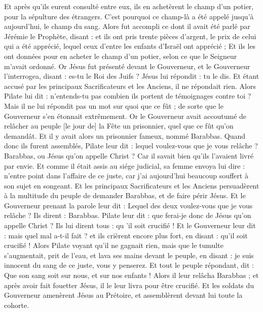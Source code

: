 \begin{multicols}{2}
Et après qu'ils eurent consulté entre eux, ils en achetèrent le champ d'un potier, pour la sépulture des étrangers.
C'est pourquoi ce champ-là a été appelé jusqu'à aujourd'hui, le champ du sang.
Alors fut accompli ce dont il avait été parlé par Jérémie le Prophète, disant : et ils ont pris trente pièces d'argent, le prix de celui qui a été apprécié, lequel ceux d'entre les enfants d'Israël ont apprécié ;
Et ils les ont données pour en acheter le champ d'un potier, selon ce que le Seigneur m'avait ordonné.
Or Jésus fut présenté devant le Gouverneur, et le Gouverneur l'interrogea, disant : es-tu le Roi des Juifs ? Jésus lui répondit : tu le dis.
Et étant accusé par les principaux Sacrificateurs et les Anciens, il ne répondait rien.
Alors Pilate lui dit : n'entends-tu pas combien ils portent de témoignages contre toi ?
Mais il ne lui répondit pas un mot sur quoi que ce fût ; de sorte que le Gouverneur s'en étonnait extrêmement.
Or le Gouverneur avait accoutumé de relâcher au peuple [le jour de] la Fête un prisonnier, quel que ce fût qu'on demandât.
Et il y avait alors un prisonnier fameux, nommé Barabbas.
Quand donc ils furent assemblés, Pilate leur dit : lequel voulez-vous que je vous relâche ? Barabbas, ou Jésus qu'on appelle Christ ?
Car il savait bien qu'ils l'avaient livré par envie.
Et comme il était assis au siége judicial, sa femme envoya lui dire : n'entre point dans l'affaire de ce juste, car j'ai aujourd'hui beaucoup souffert à son sujet en songeant.
Et les principaux Sacrificateurs et les Anciens persuadèrent à la multitude du peuple de demander Barabbas, et de faire périr Jésus.
Et le Gouverneur prenant la parole leur dit : Lequel des deux voulez-vous que je vous relâche ? Ils dirent : Barabbas.
Pilate leur dit : que ferai-je donc de Jésus qu'on appelle Christ ? Ils lui dirent tous : qu 'il soit crucifié !
Et le Gouverneur leur dit : mais quel mal a-t-il fait ? et ils crièrent encore plus fort, en disant : qu'il soit crucifié !
Alors Pilate voyant qu'il ne gagnait rien, mais que le tumulte s'augmentait, prit de l'eau, et lava ses mains devant le peuple, en disant : je suis innocent du sang de ce juste, vous y penserez.
Et tout le peuple répondant, dit : Que son sang soit sur nous, et sur nos enfants !
Alors il leur relâcha Barabbas ; et après avoir fait fouetter Jésus, il le leur livra pour être crucifié.
Et les soldats du Gouverneur amenèrent Jésus au Prétoire, et assemblèrent devant lui toute la cohorte.

\end{multicols}
